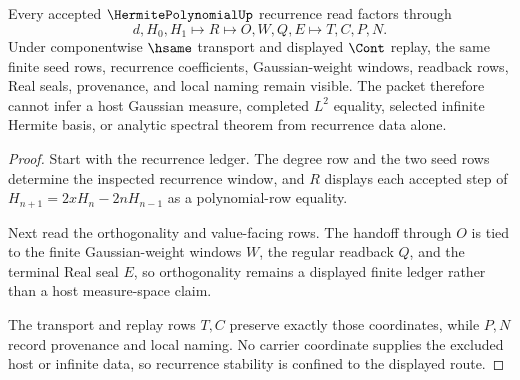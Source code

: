 \begin{theorem}
\label{thm:hermite-polynomial-recurrence-stability}
Every accepted $\HermitePolynomialUp$ recurrence read factors through
$$
d,H_0,H_1 \longmapsto R \longmapsto O,W,Q,E \longmapsto T,C,P,N .
$$
Under componentwise $\hsame$ transport and displayed $\Cont$ replay, the same finite seed rows, recurrence coefficients, Gaussian-weight windows, readback rows, Real seals, provenance, and local naming remain visible. The packet therefore cannot infer a host Gaussian measure, completed $L^2$ equality, selected infinite Hermite basis, or analytic spectral theorem from recurrence data alone.
\end{theorem}
\begin{proof}
Start with the recurrence ledger. The degree row and the two seed rows determine the inspected recurrence window, and $R$ displays each accepted step of $H_{n+1}=2xH_n-2nH_{n-1}$ as a polynomial-row equality.

Next read the orthogonality and value-facing rows. The handoff through $O$ is tied to the finite Gaussian-weight windows $W$, the regular readback $Q$, and the terminal Real seal $E$, so orthogonality remains a displayed finite ledger rather than a host measure-space claim.

The transport and replay rows $T,C$ preserve exactly those coordinates, while $P,N$ record provenance and local naming. No carrier coordinate supplies the excluded host or infinite data, so recurrence stability is confined to the displayed route.
\end{proof}




